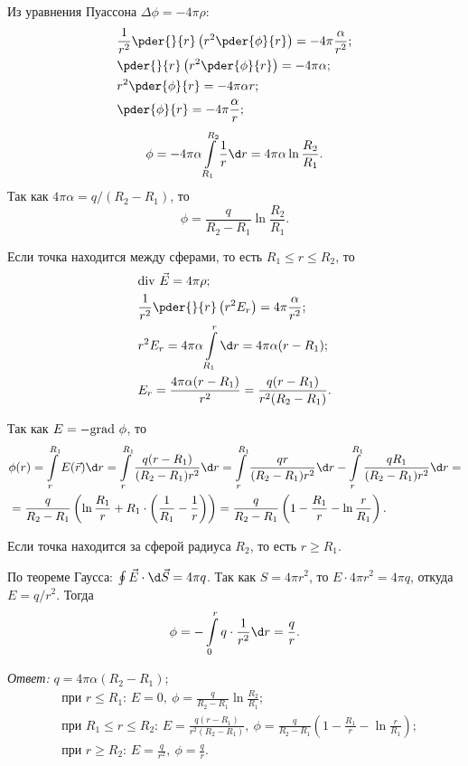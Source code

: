 Из уравнения Пуассона \( \Delta\phi = -4\pi\rho \):
\begin{align*}
    & \frac{1}{r^2} \pder{}{r}\left(r^2\pder{\phi}{r}\right) =
    -4\pi\frac{\alpha}{r^2}; \\
    & \pder{}{r}\left(r^2\pder{\phi}{r}\right) = -4\pi\alpha; \\
    & r^2 \pder{\phi}{r} = -4\pi\alpha r; \\
    & \pder{\phi}{r} = -4\pi\frac{\alpha}{r};
\end{align*}
\[
    \phi = -4\pi\alpha\int\limits_{R_1}^{R_2} \frac{1}{r}\d r =
    4\pi\alpha\ln\frac{R_2}{R_1}.    
\]
Так как \( 4\pi\alpha = q/(R_2 - R_1) \), то
\[
    \phi = \frac{q}{R_2 - R_1}\ln\frac{R_2}{R_1}.
\]

Если точка находится между сферами, то есть \( R_1 \le r \le R_2 \), то
\begin{align*}
    & \div\vec{E} = 4\pi\rho; \\
    & \frac{1}{r^2} \pder{}{r}\left(r^2E_r\right) = 4\pi\frac{\alpha}{r^2}; \\
    & r^2E_r = 4\pi\alpha\int\limits_{R_1}^r \d r = 4\pi\alpha(r - R_1); \\
    & E_r = \frac{4\pi\alpha(r - R_1)}{r^2} = \frac{q(r - R_1)}{r^2(R_2 - R_1)}.
\end{align*}

Так как \( E = -\mathrm{grad\ }\phi \), то
\begin{align*}
    & \phi(r) = \int\limits_r^{R_1} E(\vec{r})\d r = \int\limits_r^{R_1}
    \frac{q(r - R_1)}{(R_2 - R_1)r^2}\d r = \int\limits_r^{R_1} \frac{qr}{(R_2 -
    R_1)r^2}\d r - \int\limits_r^{R_1} \frac{qR_1}{(R_2 - R_1)r^2}\d r = \\
    & = \frac{q}{R_2 - R_1}\left(\ln\frac{R_1}{r} + R_1\cdot\left(\frac{1}{R_1} 
    - \frac{1}{r}\right)\right) = \frac{q}{R_2 - R_1}\left(1 - \frac{R_1}{r} -
    \ln\frac{r}{R_1}\right).
\end{align*}

Если точка находится за сферой радиуса \( R_2 \), то есть \( r \ge R_1 \).

По теореме Гаусса: \( \oint \vec{E}\cdot\d\vec{S} = 4\pi q \). Так как
\( S = 4\pi r^2 \), то \( E \cdot 4\pi r^2 = 4\pi q \), откуда \( E = q/r^2 \).
Тогда
\[
    \phi = -\int\limits_0^r q\cdot\frac{1}{r^2}\d r = \frac{q}{r}.
\]

\vspace*{2em}
\emph{Ответ:} \( q = 4\pi\alpha(R_2 - R_1) \);
\begin{align*}
    & \text{при } r \le R_1 \text{: } E = 0,\ 
    \phi = \frac{q}{R_2 - R_1}\ln\frac{R_2}{R_1}; \\
    & \text{при } R_1 \le r \le R_2 \text{: } E = \frac{q(r - R_1)}{r^2(R_2 -
    R_1)},\ 
    \phi = \frac{q}{R_2 - R_1}\left(1 - \frac{R_1}{r} - \ln\frac{r}{R_1}
    \right); \\
    & \text{при } r \ge R_2 \text{: } E = \frac{q}{r^2},\ \phi = \frac{q}{r}.
\end{align*}

